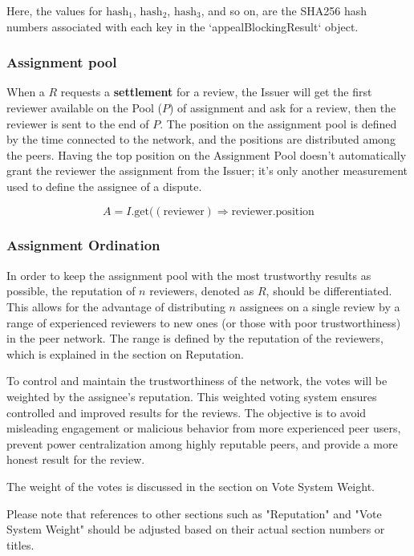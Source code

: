 \documentclass{article}
\begin{document}
Here, the values for \(\text{{hash}}_{1}\), \(\text{{hash}}_{2}\), \(\text{{hash}}_{3}\), and so on, are the SHA256 hash numbers associated with each key in the `appealBlockingResult` object.

\subsubsection{Assignment pool}
When a \(R\) requests a \textbf{settlement} for a review, the Issuer will get the first reviewer available on the Pool (\(P\)) of assignment and ask for a review, then the reviewer is sent to the end of \(P\). The position on the assignment pool is defined by the time connected to the network, and the positions are distributed among the peers. Having the top position on the Assignment Pool doesn't automatically grant the reviewer the assignment from the Issuer; it's only another measurement used to define the assignee of a dispute.

\[A = I.\text{{get}}((\text{{reviewer}}) \Rightarrow \text{{reviewer.position}} \]


\subsubsection{Assignment Ordination}

In order to keep the assignment pool with the most trustworthy results as possible, the reputation of \(n\) reviewers, denoted as \(R\), should be differentiated. This allows for the advantage of distributing \(n\) assignees on a single review by a range of experienced reviewers to new ones (or those with poor trustworthiness) in the peer network. The range is defined by the reputation of the reviewers, which is explained in the section on Reputation. 

To control and maintain the trustworthiness of the network, the votes will be weighted by the assignee's reputation. This weighted voting system ensures controlled and improved results for the reviews. The objective is to avoid misleading engagement or malicious behavior from more experienced peer users, prevent power centralization among highly reputable peers, and provide a more honest result for the review.

The weight of the votes is discussed in the section on Vote System Weight.

Please note that references to other sections such as "Reputation" and "Vote System Weight" should be adjusted based on their actual section numbers or titles.
\end{document}
